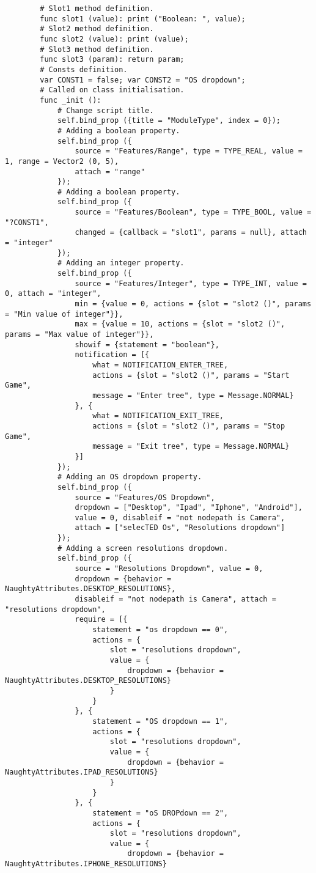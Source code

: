 \documentclass[a4paper, 11pt]{article}
\begin{document}
	\begin{lstlisting}
		# Slot1 method definition.
		func slot1 (value): print ("Boolean: ", value);
		# Slot2 method definition.
		func slot2 (value): print (value);
		# Slot3 method definition.
		func slot3 (param): return param;
		# Consts definition.
		var CONST1 = false; var CONST2 = "OS dropdown";
		# Called on class initialisation.
		func _init ():
			# Change script title.
			self.bind_prop ({title = "ModuleType", index = 0});
			# Adding a boolean property.
			self.bind_prop ({
				source = "Features/Range", type = TYPE_REAL, value = 1, range = Vector2 (0, 5),
				attach = "range"
			});
			# Adding a boolean property.
			self.bind_prop ({
				source = "Features/Boolean", type = TYPE_BOOL, value = "?CONST1",
				changed = {callback = "slot1", params = null}, attach = "integer"
			});
			# Adding an integer property.
			self.bind_prop ({
				source = "Features/Integer", type = TYPE_INT, value = 0, attach = "integer",
				min = {value = 0, actions = {slot = "slot2 ()", params = "Min value of integer"}},
				max = {value = 10, actions = {slot = "slot2 ()", params = "Max value of integer"}},
				showif = {statement = "boolean"},
				notification = [{
					what = NOTIFICATION_ENTER_TREE,
					actions = {slot = "slot2 ()", params = "Start Game",
					message = "Enter tree", type = Message.NORMAL}
				}, {
					what = NOTIFICATION_EXIT_TREE,
					actions = {slot = "slot2 ()", params = "Stop Game",
					message = "Exit tree", type = Message.NORMAL}
				}]
			});
			# Adding an OS dropdown property.
			self.bind_prop ({
				source = "Features/OS Dropdown",
				dropdown = ["Desktop", "Ipad", "Iphone", "Android"],
				value = 0, disableif = "not nodepath is Camera",
				attach = ["selecTED Os", "Resolutions dropdown"]
			});
			# Adding a screen resolutions dropdown.
			self.bind_prop ({
				source = "Resolutions Dropdown", value = 0,
				dropdown = {behavior = NaughtyAttributes.DESKTOP_RESOLUTIONS},
				disableif = "not nodepath is Camera", attach = "resolutions dropdown",
				require = [{
					statement = "os dropdown == 0",
					actions = {
						slot = "resolutions dropdown",
						value = {
							dropdown = {behavior = NaughtyAttributes.DESKTOP_RESOLUTIONS}
						}
					}
				}, {
					statement = "OS dropdown == 1",
					actions = {
						slot = "resolutions dropdown",
						value = {
							dropdown = {behavior = NaughtyAttributes.IPAD_RESOLUTIONS}
						}
					}
				}, {
					statement = "oS DROPdown == 2",
					actions = {
						slot = "resolutions dropdown",
						value = {
							dropdown = {behavior = NaughtyAttributes.IPHONE_RESOLUTIONS}

\end{lstlisting}
\end{document}
